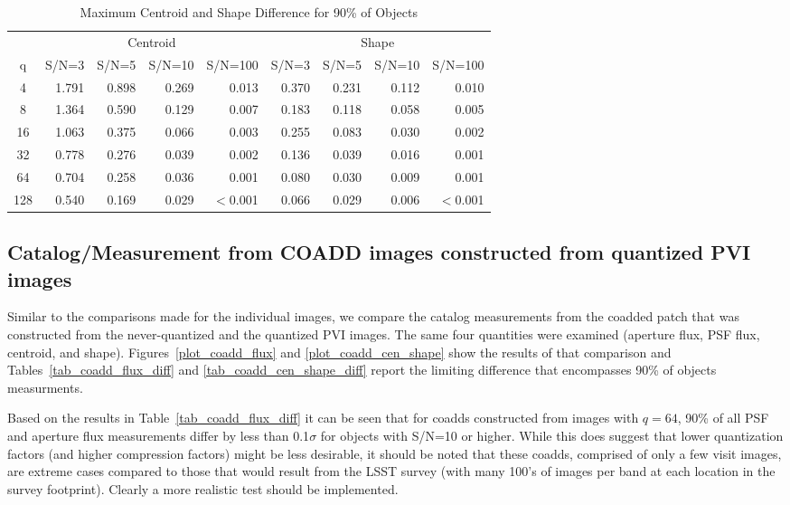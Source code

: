 \begin{table}
\caption{Maximum Centroid and Shape Difference for 90\% of Objects}
\centering
\begin{tabular}[]{c|rrrr|rrrr}
\hline
     &  \multicolumn{4}{c}{Centroid}  & \multicolumn{4}{c}{Shape} \\
 q   &  S/N=3 & S/N=5 & S/N=10 & S/N=100 & S/N=3 & S/N=5 & S/N=10 & S/N=100  \\
\hline
   4 & 1.791 & 0.898 & 0.269  & 0.013 &  0.370 & 0.231 & 0.112  & 0.010 \\
   8 & 1.364 & 0.590 & 0.129  & 0.007 &  0.183 & 0.118 & 0.058  & 0.005 \\
  16 & 1.063 & 0.375 & 0.066  & 0.003 &  0.255 & 0.083 & 0.030  & 0.002 \\
  32 & 0.778 & 0.276 & 0.039  & 0.002 &  0.136 & 0.039 & 0.016  & 0.001 \\
  64 & 0.704 & 0.258 & 0.036  & 0.001 &  0.080 & 0.030 & 0.009  & 0.001 \\
 128 & 0.540 & 0.169 & 0.029  & $<$0.001 &  0.066 & 0.029 & 0.006  & $<$0.001 \\
\hline
\end{tabular}
\label{tab_se_cen_shape_diff}
\end{table}



\clearpage

\subsection{Catalog/Measurement from COADD images constructed from quantized PVI images}

Similar to the comparisons made for the individual images, we compare the catalog measurements from the coadded patch
that was constructed from the never-quantized and the quantized PVI images.  The same four quantities were examined 
(aperture flux, PSF flux, centroid, and shape).  Figures~\ref{plot_coadd_flux} and \ref{plot_coadd_cen_shape} show
the results of that comparison and Tables~\ref{tab_coadd_flux_diff} and \ref{tab_coadd_cen_shape_diff} report the 
limiting difference that encompasses 90\% of objects measurments.

Based on the results in Table~\ref{tab_coadd_flux_diff} it can be seen that for coadds constructed from images 
with $q=64$, 90\% of all PSF and aperture flux measurements differ by less than 0.1$\sigma$ for objects 
with S/N=10 or higher.  While this does suggest that lower quantization factors (and higher compression factors)
might be less desirable, it should be noted that these coadds, comprised of only a few visit images, are extreme 
cases compared to those that would result from the LSST survey (with many 100's of images per band at each location
in the survey footprint).  Clearly a more realistic test should be implemented.

